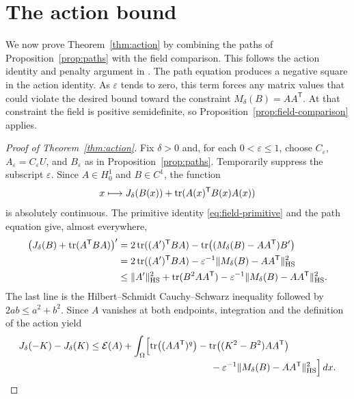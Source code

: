 \section{The action bound}
\label{sec:action-limit}

We now prove Theorem~\ref{thm:action} by combining the paths of
Proposition~\ref{prop:paths} with the field comparison.  This follows
the action identity and penalty argument in
\cite[Section~6]{ScalarCompanion}.  The path
equation produces a negative square in the action identity.  As
$\varepsilon$ tends to zero, this term forces any matrix values that
could violate the desired bound toward the constraint
$M_\delta(B)=AA^{\mathsf T}$.  At that constraint the field is positive
semidefinite, so Proposition~\ref{prop:field-comparison} applies.

\begin{proof}[Proof of Theorem~\ref{thm:action}]
Fix $\delta>0$ and, for each $0<\varepsilon\leq1$, choose
$C_\varepsilon$, $A_\varepsilon=C_\varepsilon U$, and
$B_\varepsilon$ as in Proposition~\ref{prop:paths}.  Temporarily
suppress the subscript $\varepsilon$.  Since $A\in H^1_0$ and
$B\in C^1$, the function
\[
    x\longmapsto J_\delta(B(x))+\operatorname{tr}(A(x)^{\mathsf T}B(x)A(x))
\]
is absolutely continuous.  The primitive identity
\eqref{eq:field-primitive} and the path equation give, almost
everywhere,
\begin{align*}
    \bigl(J_\delta(B)+\operatorname{tr}(A^{\mathsf T}BA)\bigr)'
       &=2\operatorname{tr}((A')^{\mathsf T}BA)
          -\operatorname{tr}\bigl((M_\delta(B)-AA^{\mathsf T})B'\bigr)\\
       &=2\operatorname{tr}((A')^{\mathsf T}BA)
          -\varepsilon^{-1}
              \|M_\delta(B)-AA^{\mathsf T}\|_{\mathrm{HS}}^2\\
       &\leq\|A'\|_{\mathrm{HS}}^2+\operatorname{tr}(B^2AA^{\mathsf T})
          -\varepsilon^{-1}
              \|M_\delta(B)-AA^{\mathsf T}\|_{\mathrm{HS}}^2.
\end{align*}
The last line is the Hilbert--Schmidt Cauchy--Schwarz inequality followed
by $2ab\leq a^2+b^2$.  Since $A$ vanishes at both endpoints,
integration and the definition of the action yield
\begin{align}
\label{eq:action-penalty}
    J_\delta(-K)-J_\delta(K)
       \leq{}&\mathcal E(A)
       +\int_\Omega\Bigl[
            \tr\bigl((AA^{\mathsf T})^q\bigr)
            -\tr\bigl((K^2-B^2)AA^{\mathsf T}\bigr)
            \notag\\[-2pt]
       &\hspace{40mm}
            -\varepsilon^{-1}
                \|M_\delta(B)-AA^{\mathsf T}\|_{\HS}^2
                         \Bigr]\,dx.
\end{align}


\end{proof}
